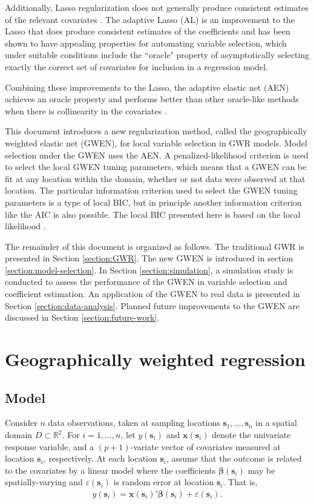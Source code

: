 \documentclass[authoryear, review, 11pt]{elsarticle}
\begin{document}
	Additionally, Lasso regularization does not generally produce consistent estimates of the relevant covariates \citep{Leng-2006}. The adaptive Lasso (AL) \citep{Zou:2006} is an improvement to the Lasso that does produce consistent estimates of the coefficients and has been shown to have appealing properties for automating variable selection, which under suitable conditions include the ``oracle" property of asymptotically selecting exactly the correct set of covariates for inclusion in a regression model.
	
	Combining these improvements to the Lasso, the adaptive elastic net (AEN) achieves an oracle property and performs better than other oracle-like methods when there is collinearity in the covariates \citep{Zou:2009}.
	
	This document introduces a new regularization method, called the geographically weighted elastic net (GWEN), for local variable selection in GWR models. Model selection under the GWEN uses the AEN. A penalized-likelihood criterion is used to select the local GWEN tuning parameters, which means that a GWEN can be fit at any location within the domain, whether or not data were observed at that location. The particular information criterion used to select the GWEN tuning parameters is a type of local BIC, but in principle another information criterion like the AIC is also possible. The local BIC presented here is based on the local likelihood \citep{Loader:1999}.
	
	The remainder of this document is organized as follows. The traditional GWR is presented in Section \ref{section:GWR}. The new GWEN is introduced in section \ref{section:model-selection}. In Section \ref{section:simulation}, a simulation study is conducted to assess the performance of the GWEN in variable selection and coefficient estimation. An application of the GWEN to real data is presented in Section \ref{section:data-analysis}. Planned future improvements to the GWEN are discussed in Section \ref{section:future-work}.

\section{Geographically weighted regression \label{section:GWR}}
	\subsection{Model}	
	Consider $n$ data observations, taken at sampling locations $\bm{s}_1, \dots, \bm{s}_n$ in a spatial domain $D \subset \mathbb{R}^2$. For $i = 1, \dots, n$, let $y(\bm{s}_i)$ and $\bm{x}(\bm{s}_i)$ denote the univariate response variable, and a $(p+1)$-variate vector of covariates measured at location $\bm{s}_i$, respectively. At each location $\bm{s}_i$, assume that the outcome is related to the covariates by a linear model where the coefficients $\bm{\beta}(\bm{s}_i)$ may be spatially-varying and $\varepsilon(\bm{s}_i)$ is random error at location $\bm{s}_i$. That is,
	\begin{align}\label{eq:lm(s)}
		y(\bm{s}_i) = \bm{x}(\bm{s}_i)' \bm{\beta}(\bm{s}_i) + \varepsilon(\bm{s}_i).
	\end{align}
	
\end{document}
